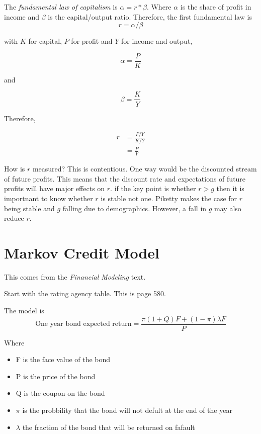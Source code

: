 \documentclass[12pt, a4paper, oneside]{article} %
\begin{document}
The \emph{fundamental law of capitalism} is $\alpha = r*\beta$.  Where $\alpha$ is the share of profit in income and $\beta$ is the capital/output ratio.  Therefore, the first fundamental law is
\begin{equation}
r = \alpha/\beta
\end{equation}

with $K$ for capital, $P$ for profit and $Y$ for income and output,

\begin{equation}
\alpha = \frac{P}{K}
\end{equation} 

and 

\begin{equation}
\beta = \frac{K}{Y}
\end{equation}

Therefore, 

\begin{align*}
r &= \frac{P/Y}{K/Y}\\
&= \frac{P}{Y}
\end{align*}

How is $r$ measured?  This is contentious.  One way would be the discounted stream of future profits.  This means that the discount rate and expectations of future profits will have major effects on $r$.  if the key point is whether $r > g$ then it is importnant to know whether $r$ is stable not one.  Piketty makes the case for $r$ being stable and $g$ falling due to demographics.  However, a fall in $g$ may also reduce $r$.    
\section{Markov Credit Model}
This comes from the \emph{Financial Modeling} text.  

Start with the rating agency table.  This is page 580. 

The model is
\begin{equation}
\text{One year bond expected return} = \frac{\pi(1 + Q)F + (1 - \pi)\lambda F}{P}
\end{equation}

Where 
\begin{itemize}
\item F is the face value of the bond
\item P is the price of the bond
\item Q is the coupon on the bond
\item $\pi$ is the probbility that the bond will not defult at the end of the year
\item $\lambda$ the fraction of the bond that will be returned on fafault
\end{itemize}
\end{document}
